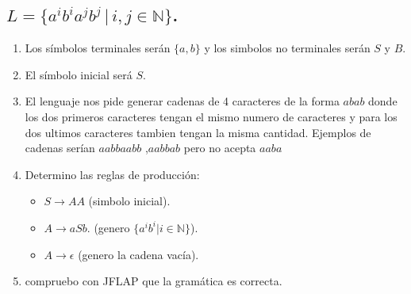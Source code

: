 \documentclass{article}
\begin{document}
        \subsection{$L = \{a^i b^i a^j b^j \, | \, i, j \in \mathbb{N}\}$.}
        \begin{flushleft}
            \begin{enumerate}
                \item Los símbolos terminales serán $\{a,b\}$ y los simbolos no terminales serán $S$ y $B$.
                \item El símbolo inicial será $S$.
                \item El lenguaje nos pide generar cadenas de 4 caracteres de la forma $abab$ donde los dos primeros caracteres tengan 
                el mismo numero de caracteres y para los dos ultimos caracteres tambien tengan la misma cantidad. Ejemplos de cadenas serían $aabbaabb$ ,$aabbab$ pero no acepta $aaba$
                \item Determino las reglas de producción:
                \begin{itemize}
                    \item $S \rightarrow AA$ (simbolo inicial).
                    \item $A \rightarrow aSb$. (genero $\{a^i b^i | i \in \mathbb{N}\}$).
                    \item $A \rightarrow \epsilon$ (genero la cadena vacía).
                \end{itemize}

                \item compruebo con JFLAP que la gramática es correcta.
                


\end{enumerate}
\end{flushleft}
\end{document}
